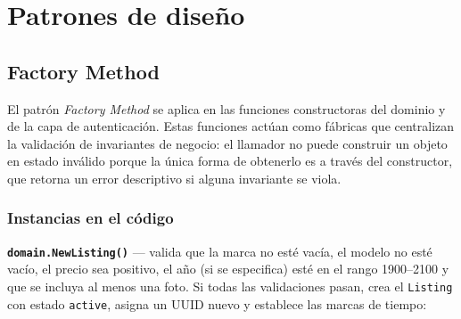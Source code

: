 \documentclass[12pt,a4paper]{article}
\begin{document}
\begin{center}
\end{center}

\clearpage
\section{Patrones de diseño}

\subsection{Factory Method}

El patrón \emph{Factory Method} se aplica en las funciones constructoras del dominio y de la
capa de autenticación. Estas funciones actúan como fábricas que centralizan la validación de
invariantes de negocio: el llamador no puede construir un objeto en estado inválido porque la
única forma de obtenerlo es a través del constructor, que retorna un error descriptivo si alguna
invariante se viola.
\subsubsection{Instancias en el código}

\textbf{\texttt{domain.NewListing()}} --- valida que la marca no esté vacía, el modelo no esté
vacío, el precio sea positivo, el año (si se especifica) esté en el rango 1900--2100 y que se
incluya al menos una foto. Si todas las validaciones pasan, crea el \texttt{Listing} con estado
\texttt{active}, asigna un UUID nuevo y establece las marcas de tiempo:
\end{document}
